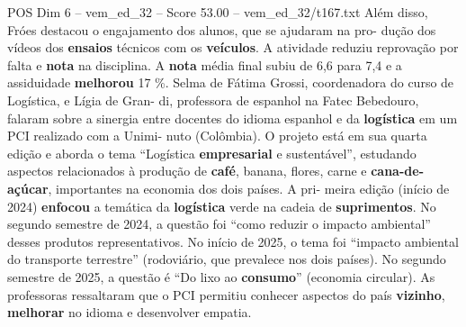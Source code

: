 \begin{textsample}{POS Dim 6 – vem\_ed\_32 – Score 53.00 – vem\_ed\_32/t167.txt}
Além disso, Fróes destacou o engajamento dos alunos, que se ajudaram na pro- dução dos vídeos dos \textbf{ensaios} técnicos com os \textbf{veículos}.
A atividade reduziu reprovação por falta e \textbf{nota} na disciplina.
A \textbf{nota} média final subiu de 6,6 para 7,4 e a assiduidade \textbf{melhorou} 17 \%.
Selma de Fátima Grossi, coordenadora do curso de Logística, e Lígia de Gran- di, professora de espanhol na Fatec Bebedouro, falaram sobre a sinergia entre docentes do idioma espanhol e da \textbf{logística} em um PCI realizado com a Unimi- nuto (Colômbia).
O projeto está em sua quarta edição e aborda o tema “Logística \textbf{empresarial} e sustentável”, estudando aspectos relacionados à produção de \textbf{café}, banana, flores, carne e \textbf{cana-de-açúcar}, importantes na economia dos dois países.
A pri- meira edição (início de 2024) \textbf{enfocou} a temática da \textbf{logística} verde na cadeia de \textbf{suprimentos}.
No segundo semestre de 2024, a questão foi “como reduzir o impacto ambiental” desses produtos representativos.
No início de 2025, o tema foi “impacto ambiental do transporte terrestre” (rodoviário, que prevalece nos dois países).
No segundo semestre de 2025, a questão é “Do lixo ao \textbf{consumo}” (economia circular).
As professoras ressaltaram que o PCI permitiu conhecer aspectos do país \textbf{vizinho}, \textbf{melhorar} no idioma e desenvolver empatia.

\end{textsample}
